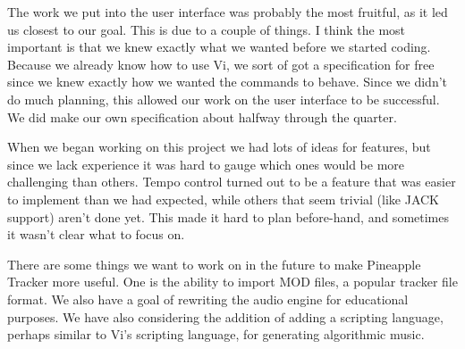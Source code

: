 \documentclass[12pt,letterpaper]{article}
\begin{document}
\par
The work we put into the user interface was probably the most fruitful, as it led us closest to our goal. This is due to a couple of things. I think the most important is that we knew exactly what we wanted before we started coding. Because we already know how to use Vi, we sort of got a specification for free since we knew exactly how we wanted the commands to behave. Since we didn't do much planning, this allowed our work on the user interface to be successful. We did make our own specification about halfway through the quarter.

\par
When we began working on this project we had lots of ideas for features, but since we lack experience it was hard to gauge which ones would be more challenging than others. Tempo control turned out to be a feature that was easier to implement than we had expected, while others that seem trivial (like JACK support) aren't done yet. This made it hard to plan before-hand, and sometimes it wasn't clear what to focus on.

\par
There are some things we want to work on in the future to make Pineapple Tracker more useful. One is the ability to import MOD files, a popular tracker file format. We also have a goal of rewriting the audio engine for educational purposes. We have also considering the addition of adding a scripting language, perhaps similar to Vi's scripting language, for generating algorithmic music.
\end{document}
